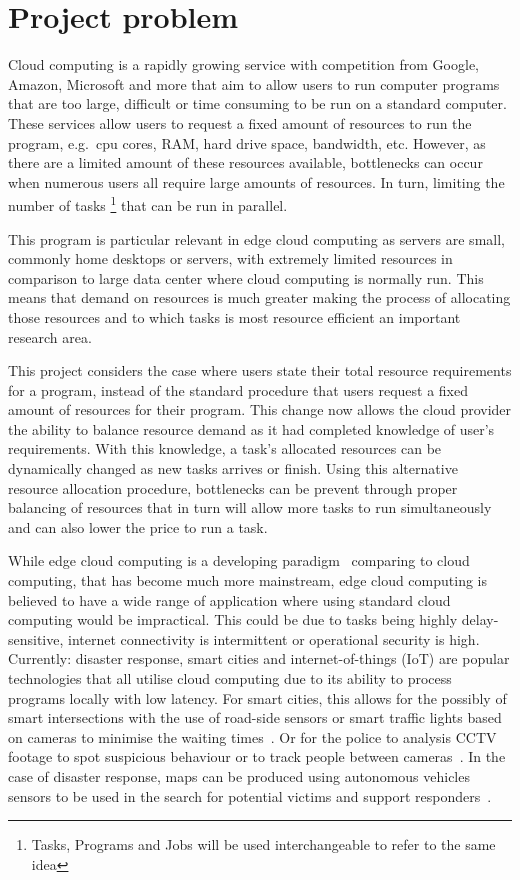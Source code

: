 \chapter{Project problem}\label{ch:project-problem}
Cloud computing is a rapidly growing service with competition from Google, Amazon, Microsoft and more that aim to
allow users to run computer programs that are too large, difficult or time consuming to be run on a standard computer.
These services allow users to request a fixed amount of resources to run the program, e.g.\ cpu cores, RAM, hard drive
space, bandwidth, etc. However, as there are a limited amount of these resources available, bottlenecks can occur
when numerous users all require large amounts of resources. In turn, limiting the number of tasks
\footnote{Tasks, Programs and Jobs will be used interchangeable to refer to the same idea} that can be run in parallel.

This program is particular relevant in edge cloud computing as servers are small, commonly home desktops or servers,
with extremely limited resources in comparison to large data center where cloud computing is normally run. This means
that demand on resources is much greater making the process of allocating those resources and to which tasks is most
resource efficient an important research area.

This project considers the case where users state their total resource requirements for a program, instead of the
standard procedure that users request a fixed amount of resources for their program. This change now allows the cloud
provider the ability to balance resource demand as it had completed knowledge of user's requirements. With this
knowledge, a task's allocated resources can be dynamically changed as new tasks arrives or finish. Using this
alternative resource allocation procedure, bottlenecks can be prevent through proper balancing of resources that in
turn will allow more tasks to run simultaneously and can also lower the price to run a task.

While edge cloud computing is a developing paradigm~\citep{mobile_edge_survey} comparing to cloud computing, that has
become much more mainstream, edge cloud computing is believed to have a wide range of application where using standard cloud computing would be
impractical. This could be due to tasks being highly delay-sensitive, internet connectivity is intermittent or
operational security is high. \\
Currently: disaster response, smart cities and internet-of-things (IoT) are popular technologies that all utilise
cloud computing due to its ability to process programs locally with low latency. For smart cities, this
allows for the possibly of smart intersections with the use of road-side sensors or smart traffic lights based
on cameras to minimise the waiting times~\citep{smart_cities_traffic_lights}. Or for the police to analysis
CCTV footage to spot suspicious behaviour or to track people between cameras~\citep{Sreenu2019}. In the case
of disaster response, maps can be produced using autonomous vehicles sensors to be used in the search for potential
victims and support responders~\citep{smart_disaster_management}.

